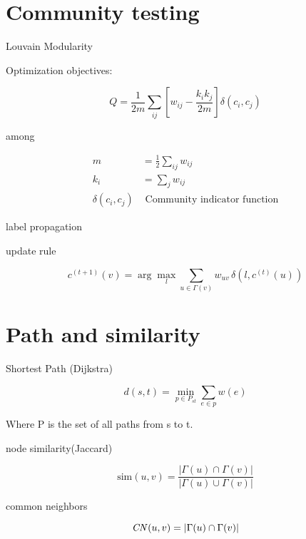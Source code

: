 \documentclass{article}
\begin{document}
\section{Community testing}

Louvain Modularity



Optimization objectives:

\begin{equation}
Q = \frac{1}{2m} \sum_{ij} \left[ w_{ij} - \frac{k_i k_j}{2m} \right] \delta(c_i, c_j)
\end{equation}

among

\begin{align}
m &= \frac{1}{2} \sum_{ij} w_{ij} \\
k_i &= \sum_j w_{ij} \\
\delta(c_i, c_j) &\text{ Community indicator function}
\end{align}

label propagation

update rule

\begin{equation}
c^{(t+1)}(v) = \arg\max_{l} \sum_{u \in \Gamma(v)} w_{uv} \, \delta(l, c^{(t)}(u))
\end{equation}






\section{Path and similarity
}

{Shortest Path  (Dijkstra)}

\begin{equation}
d(s, t) = \min_{p \in P_{st}} \sum_{e \in p} w(e)
\end{equation}

{Where P is the set of all paths from s to t.}

 node similarity(Jaccard)

\begin{equation}
\text{sim}(u, v) = \frac{|\Gamma(u) \cap \Gamma(v)|}{|\Gamma(u) \cup \Gamma(v)|}
\end{equation}

common neighbors 

\begin{equation}
\text{\textit{CN}}(u, v) = |\Gamma(u) \cap \Gamma(v)|
\end{equation}
\end{document}
